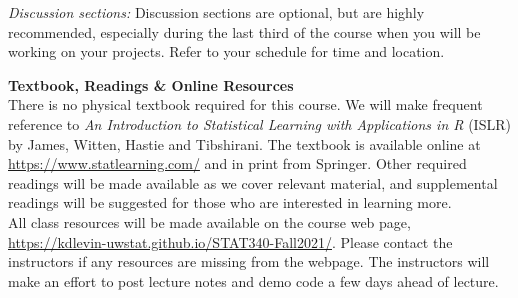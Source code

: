 \documentclass[11pt,oneside]{amsart}
\newcommand{\header}[1]{\bigbreak\textbf{#1}}
\begin{document}
{\em Discussion sections:} Discussion sections are optional, but are highly recommended, especially during the last third of the course when you will be working on your projects. Refer to your schedule for time and location.

\header{Textbook, Readings \& Online Resources}\\
There is no physical textbook required for this course.
We will make frequent reference to
{\em An Introduction to Statistical Learning with Applications in R} (ISLR) by James, Witten, Hastie and Tibshirani.
The textbook is available online at \url{https://www.statlearning.com/} and in print from Springer.
Other required readings will be made available as we cover relevant material, and supplemental readings will be suggested for those who are interested in learning more.\\

All class resources will be made available on the course web page,
\url{https://kdlevin-uwstat.github.io/STAT340-Fall2021/}.
Please contact the instructors if any resources are missing from the webpage.
The instructors will make an effort to post lecture notes and demo code a few days ahead of lecture.

%
%
\end{document}
